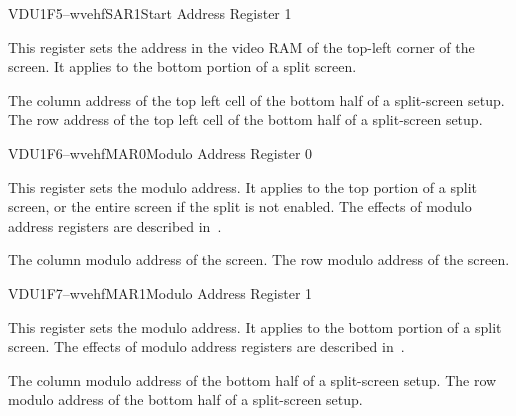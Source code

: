 \begin{ioport}{VDU}{1F5}{--wvehf}{SAR1}{Start Address Register 1}

  This register sets the address in the video RAM of the top-left corner of the
  screen. It applies to the bottom portion of a split screen.

  \begin{cbitfield}[8]
  \end{cbitfield}

  \begin{description}
   The column address of the top left cell of the bottom half of a split-screen setup.
   The row address of the top left cell of the bottom half of a split-screen setup.
  \end{description}

\end{ioport}




\begin{ioport}{VDU}{1F6}{--wvehf}{MAR0}{Modulo Address Register 0}

  This register sets the modulo address. It applies to the top portion of a
  split screen, or the entire screen if the split is not enabled. The effects
  of modulo address registers are described in~.

  \begin{cbitfield}[8]
  \end{cbitfield}

  \begin{description}
   The column modulo address of the screen.
   The row modulo address of the screen.
  \end{description}

\end{ioport}






\begin{ioport}{VDU}{1F7}{--wvehf}{MAR1}{Modulo Address Register 1}

  This register sets the modulo address. It applies to the bottom portion of a
  split screen. The effects of modulo address registers are described
  in~.

  \begin{cbitfield}[8]
  \end{cbitfield}

  \begin{description}
   The column modulo address of the bottom half of a split-screen setup.
   The row modulo address of the bottom half of a split-screen setup.
  \end{description}

\end{ioport}




